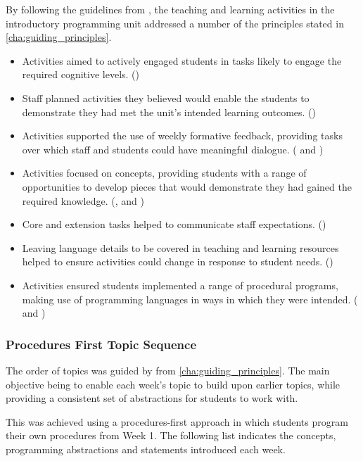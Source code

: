 By following the guidelines from , the teaching and learning activities in the introductory programming unit addressed a number of the principles stated in \cref{cha:guiding_principles}. 

\begin{itemize}[noitemsep,nolistsep]
	\item Activities aimed to actively engaged students in tasks likely to engage the required cognitive levels. ()
	\item Staff planned activities they believed would enable the students to demonstrate they had met the unit's intended learning outcomes. () 
	\item Activities supported the use of weekly formative feedback, providing tasks over which staff and students could have meaningful dialogue. ( and )
	\item Activities focused on concepts, providing students with a range of opportunities to develop pieces that would demonstrate they had gained the required knowledge. (,  and )
	\item Core and extension tasks helped to communicate staff expectations. ()
	\item Leaving language details to be covered in teaching and learning resources helped to ensure activities could change in response to student needs. ()
	\item Activities ensured students implemented a range of procedural programs, making use of programming languages in ways in which they were intended. ( and )
\end{itemize}

\clearpage
\subsubsection{Procedures First Topic Sequence} %
\label{ssub:procedures_first_topic_sequence}

The order of topics was guided by  from \cref{cha:guiding_principles}. The main objective being to enable each week's topic to build upon earlier topics, while providing a consistent set of abstractions for students to work with.

This was achieved using a procedures-first approach in which students program their own procedures from Week 1. The following list indicates the concepts, programming abstractions and statements introduced each week.

